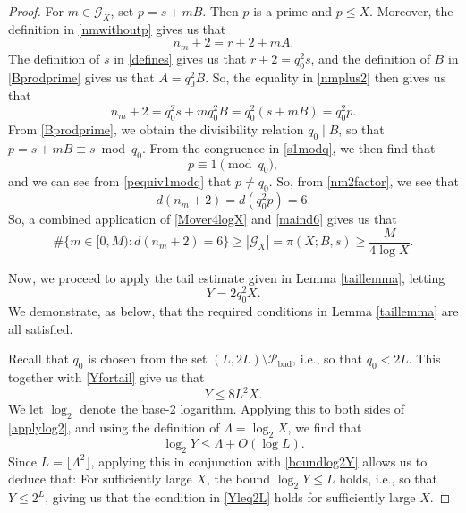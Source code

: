 \documentclass[12pt]{article}
\begin{document}
\begin{proof}
 For $m \in \mathcal{G}_{X}$, set $ p = s + m B$. Then $p$ is a prime and $p \leq X$. Moreover, the definition in \eqref{nmwithoutp} 
 gives us that 
\begin{equation}\label{nmplus2} 
 n_m + 2 = r + 2 + m A. 
\end{equation}
 The definition of $s$ in \eqref{defines} gives us that 
 $ r + 2 = q_0^2 s$, 
 and the definition of $B$ in \eqref{Bprodprime}
 gives us that $ A = q_0^2 B$. 
 So, the equality in \eqref{nmplus2} then gives us that 
\begin{equation}\label{nm2factor} 
 n_m + 2 = q_0^2 s + m q_0^2 B = q_0^2 (s + m B) = q_0^2 p. 
\end{equation}
 From \eqref{Bprodprime}, we obtain the divisibility relation 
 $q_0 \mid B$, so that 
 $ p = s + m B \equiv s \bmod {{q}_{0}}$. 
 From the congruence in \eqref{s1modq}, we then find that 
\begin{equation}\label{pequiv1modq} 
 p \equiv 1 \pmod {{q}_{0}}, 
\end{equation}
 and we can see from \eqref{pequiv1modq}
 that $p \neq q_0$. 
 So, from \eqref{nm2factor}, we see that 
\begin{equation}\label{maind6} 
 d(n_m +2) = d(q_0^2 p) = 6. 
\end{equation}
 So, a combined application of \eqref{Mover4logX} and \eqref{maind6} gives us that 
\begin{equation}\label{GpiMX} 
 \#\big\{ m \in [0, M) : d(n_m + 2) = 6 \big\} 
 \geq |\mathcal{G}_{X}| =\pi(X;B,s) \geq \frac{M}{4 \log X}. 
\end{equation}

 Now, we proceed to apply the tail estimate given in Lemma \ref{taillemma}, letting 
\begin{equation}\label{Yfortail}
 Y = 2 q_0^2 X.
\end{equation}
 We demonstrate, as below, that the required conditions
 in Lemma \ref{taillemma} are all satisfied. 

 Recall that $q_0$ is chosen from the set $ (L, 2L) \setminus \mathcal{P}_{\operatorname{bad}}$, 
 i.e., so that $q_0 < 2 L$. This together with \eqref{Yfortail}
 give us that 
\begin{equation}\label{applylog2}
 Y \leq 8 L^2 X. 
\end{equation} 
 We let $\log_2$ denote the base-2 logarithm. Applying this to both sides of 
 \eqref{applylog2}, and using the definition of $\Lambda = \log_2 X$, 
 we find that 
\begin{equation}\label{boundlog2Y}
 \log_2 Y \leq \Lambda + O(\log L). 
\end{equation}
 Since $L = \lfloor \Lambda^2 \rfloor$, applying this in conjunction with \eqref{boundlog2Y} allows us to deduce that: For sufficiently 
 large $X$, the bound $ \log_2 Y \leq L $ holds, i.e., so that $Y \leq 2^L$, giving us that the condition in \eqref{Yleq2L} holds for 
 sufficiently large $X$. 


\end{proof}
\end{document}
